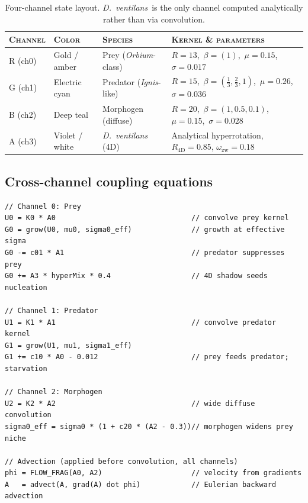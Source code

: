 \documentclass[11pt,a4paper]{article}
\newcommand{\spc}[1]{\textit{#1}}  %
\newcommand{\DV}{\spc{D.\ ventilans}}
\begin{document}
\begin{table}[h!]
\small\sffamily
\renewcommand{\arraystretch}{1.25}
\begin{tabularx}{\linewidth}{@{}l l l >{\raggedright\arraybackslash}X@{}}
\toprule
\textsc{Channel} & \textsc{Color} & \textsc{Species} & \textsc{Kernel \& parameters}\\
\midrule
R (ch0)    & Gold / amber       & Prey (\spc{Orbium}-class) & $R{=}13$,\ $\beta{=}(1)$,\ $\mu{=}0.15$,\ $\sigma{=}0.017$\\
G (ch1)    & Electric cyan      & Predator (\spc{Ignis}-like) & $R{=}15$,\ $\beta{=}(\tfrac{1}{3},\tfrac{2}{3},1)$,\ $\mu{=}0.26$,\ $\sigma{=}0.036$\\
B (ch2)    & Deep teal          & Morphogen (diffuse)     & $R{=}20$,\ $\beta{=}(1,0.5,0.1)$,\ $\mu{=}0.15$,\ $\sigma{=}0.028$\\
\rowcolor{codebg}
A (ch3)    & Violet / white     & \textit{D.\ ventilans} (4D) & Analytical hyperrotation, $R_{\!4\mathrm{D}}{=}0.85$, $\omega_{\!\mathrm{zw}}{=}0.18$\\
\bottomrule
\end{tabularx}
\caption{\small Four-channel state layout. \DV\ is the only channel
computed analytically rather than via convolution.}
\end{table}

\subsection{Cross-channel coupling equations}

\begin{lstlisting}[language=pseudo, caption={\textsc{sim\_frag} --- the full update rule, per simulation step. \texttt{hyperMix} is the causal dial from 4D shadow to 2D ecology.}]
// Channel 0: Prey
U0 = K0 * A0                                // convolve prey kernel
G0 = grow(U0, mu0, sigma0_eff)              // growth at effective sigma
G0 -= c01 * A1                              // predator suppresses prey
G0 += A3 * hyperMix * 0.4                   // 4D shadow seeds nucleation

// Channel 1: Predator
U1 = K1 * A1                                // convolve predator kernel
G1 = grow(U1, mu1, sigma1_eff)
G1 += c10 * A0 - 0.012                      // prey feeds predator; starvation

// Channel 2: Morphogen
U2 = K2 * A2                                // wide diffuse convolution
sigma0_eff = sigma0 * (1 + c20 * (A2 - 0.3))// morphogen widens prey niche

// Advection (applied before convolution, all channels)
phi = FLOW_FRAG(A0, A2)                     // velocity from gradients
A   = advect(A, grad(A) dot phi)            // Eulerian backward advection
\end{lstlisting}
\end{document}
